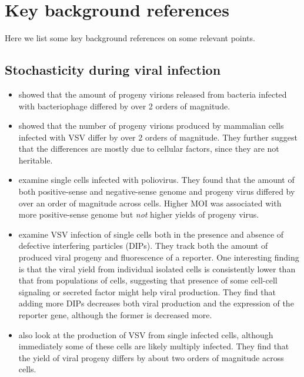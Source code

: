 \documentclass[9pt,lineno]{elife}
\begin{document}
\section{Key background references}
Here we list some key background references on some relevant points.

\subsection{Stochasticity during viral infection}
\begin{itemize}

\item \citet{delbruck1945burst} showed that the amount of progeny virions released from bacteria infected with bacteriophage differed by over 2 orders of magnitude.

\item \citet{zhu2009growth} showed that the number of progeny virions produced by mammalian cells infected with VSV differ by over 2 orders of magnitude. 
They further suggest that the differences are mostly due to cellular factors, since they are not heritable.

\item \citet{schulte2014single} examine single cells infected with poliovirus.
They found that the amount of both positive-sense and negative-sense genome and progeny virus differed by over an order of magnitude across cells.
Higher MOI was associated with more positive-sense genome but \emph{not} higher yields of progeny virus.

\item \citet{akpinar2016high} examine VSV infection of single cells both in the presence and absence of defective interfering particles (DIPs). 
They track both the amount of produced viral progeny and fluorescence of a reporter.
One interesting finding is that the viral yield from individual isolated cells is consistently lower than that from populations of cells, suggesting that presence of some cell-cell signaling or secreted factor might help viral production.
They find that adding more DIPs decreases both viral production and the expression of the reporter gene, although the former is decreased more.

\item \citet{combe2015single} also look at the production of VSV from single infected cells, although immediately some of these cells are likely multiply infected. 
They find that the yield of viral progeny differs by about two orders of magnitude across cells.


\end{itemize}
\end{document}

